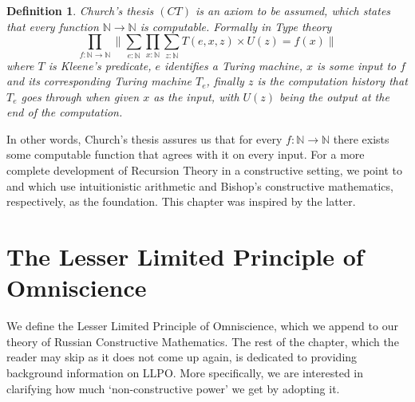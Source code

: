 \documentclass[12pt]{report}
\newtheorem{defn}[thm]{Definition}
\theoremstyle{definition}
\begin{document}
\begin{defn}\label{CT}
Church's thesis $(CT)$ is an axiom to be assumed, which states that every function $\mathbb{N}\rightarrow \mathbb{N}$ is computable. 
Formally in Type theory
$$\prod_{f : \mathbb{N}\rightarrow \mathbb{N}} \Big\lVert \sum_{e : \mathbb{N}} \prod_{x : \mathbb{N}} \sum_{z : \mathbb{N}} T(e,x,z) \times U(z) = f(x) \Big\rVert$$
where $T$ is Kleene's predicate, $e$ identifies a Turing machine, $x$ is some input to $f$ and its corresponding Turing machine $T_e$, finally $z$ is the computation history that $T_e$ goes through when given $x$ as the input, with $U(z)$ being the output at the end of the computation.
\end{defn}

In other words, Church's thesis assures us that for every $f : \mathbb{N} \rightarrow \mathbb{N}$ there exists some computable function that agrees with it on every input.
For a more complete development of Recursion Theory in a constructive setting, we point to \cite{recursionInHA} and \cite{bridges_richman_1987_1} which use intuitionistic arithmetic and Bishop's constructive mathematics, respectively, as the foundation. 
This chapter was inspired by the latter. 

\chapter{The Lesser Limited Principle of Omniscience}\label{ChapterLLPO}
We define the Lesser Limited Principle of Omniscience, which we append to our theory of Russian Constructive Mathematics. 
The rest of the chapter, which the reader may skip as it does not come up again, is dedicated to providing background information on LLPO. 
More specifically, we are interested in clarifying how much `non-constructive power' we get by adopting it. 
\end{document}
